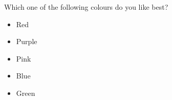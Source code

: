 \begin{tcolorbox}
Which one of the following colours do you like best?

\begin{itemize}
	\item Red
	\item Purple
	\item Pink
	\item Blue
	\item Green
\end{itemize}
\end{tcolorbox}
